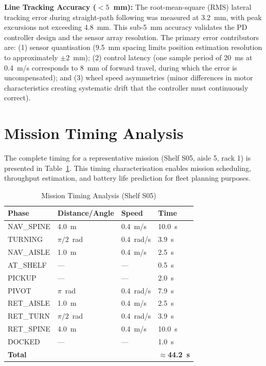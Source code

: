 \documentclass[12pt,a4paper,oneside]{report}
\begin{document}
\textbf{Line Tracking Accuracy ($< 5$~mm):} The root-mean-square (RMS) lateral tracking error during straight-path following was measured at 3.2~mm, with peak excursions not exceeding 4.8~mm. This sub-5~mm accuracy validates the PD controller design and the sensor array resolution. The primary error contributors are: (1) sensor quantisation (9.5~mm spacing limits position estimation resolution to approximately $\pm 2$~mm); (2) control latency (one sample period of 20~ms at 0.4~m/s corresponds to 8~mm of forward travel, during which the error is uncompensated); and (3) wheel speed asymmetries (minor differences in motor characteristics creating systematic drift that the controller must continuously correct).

\section{Mission Timing Analysis}

The complete timing for a representative mission (Shelf S05, aisle 5, rack 1) is presented in Table~\ref{tab:timing}. This timing characterisation enables mission scheduling, throughput estimation, and battery life prediction for fleet planning purposes.

\begin{table}[H]
\centering
\caption{Mission Timing Analysis (Shelf S05)}
\label{tab:timing}
\begin{tabular}{p{3cm} p{3cm} p{2cm} p{2cm}}
\toprule
\textbf{Phase} & \textbf{Distance/Angle} & \textbf{Speed} & \textbf{Time} \\
\midrule
NAV\_SPINE & 4.0~m & 0.4~m/s & 10.0~s \\
TURNING & $\pi/2$~rad & 0.4~rad/s & 3.9~s \\
NAV\_AISLE & 1.0~m & 0.4~m/s & 2.5~s \\
AT\_SHELF & --- & --- & 0.5~s \\
PICKUP & --- & --- & 2.0~s \\
PIVOT & $\pi$~rad & 0.4~rad/s & 7.9~s \\
RET\_AISLE & 1.0~m & 0.4~m/s & 2.5~s \\
RET\_TURN & $\pi/2$~rad & 0.4~rad/s & 3.9~s \\
RET\_SPINE & 4.0~m & 0.4~m/s & 10.0~s \\
DOCKED & --- & --- & 1.0~s \\
\midrule
\textbf{Total} & & & $\approx$\textbf{44.2~s} \\
\bottomrule
\end{tabular}
\end{table}
\end{document}
